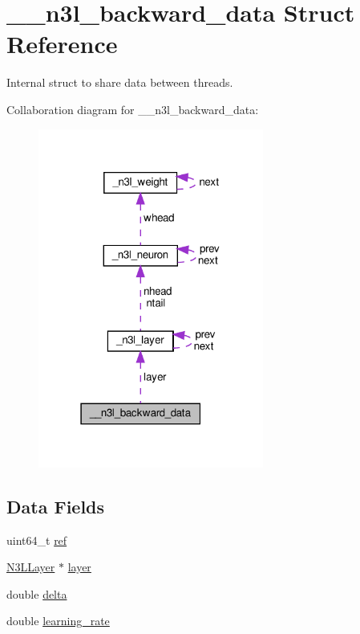 \hypertarget{struct____n3l__backward__data}{}\section{\+\_\+\+\_\+n3l\+\_\+backward\+\_\+data Struct Reference}
\label{struct____n3l__backward__data}


Internal struct to share data between threads.  




Collaboration diagram for \+\_\+\+\_\+n3l\+\_\+backward\+\_\+data\+:
\nopagebreak
\begin{figure}[H]
\begin{center}
\leavevmode
\includegraphics[width=210pt]{struct____n3l__backward__data__coll__graph}
\end{center}
\end{figure}
\subsection*{Data Fields}
\begin{DoxyCompactItemize}
\item 
uint64\+\_\+t \hyperlink{struct____n3l__backward__data_a32ef8a9b7e79121a563b8cd5486f88d3}{ref}
\item 
\hyperlink{n3__header_8h_a9ee3a7104816bdb6222148cfe9ca8ad9}{N3\+L\+Layer} $\ast$ \hyperlink{struct____n3l__backward__data_a0dcc17f32256df3e7ec65046236ffd24}{layer}
\item 
double \hyperlink{struct____n3l__backward__data_ab41bb2c143496d239fe41b208809cc85}{delta}
\item 
double \hyperlink{struct____n3l__backward__data_aa29c1bf7dcb85bfaaa0ec9b01cecc425}{learning\+\_\+rate}
\end{DoxyCompactItemize}


